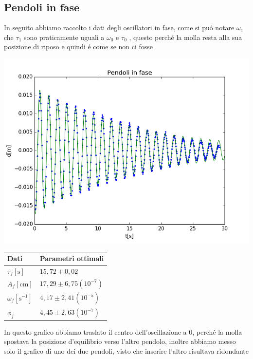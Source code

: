 \documentclass{exam}
\begin{document}
			\subsection{Pendoli in fase}
			In seguito abbiamo raccolto i dati degli oscillatori in fase, come si pu\'o notare $\omega_{1}$ che $\tau_{1}$ sono praticamente uguali a $\omega_{0}$ e $\tau_{0}$ , questo perch\'e la molla resta alla sua posizione di riposo e quindi \'e come se non ci fosse\\
			\begin{minipage}{0.5\textwidth}
				\includegraphics[width=\textwidth]{fase}
			\end{minipage}
			\begin{minipage}{0.5\textwidth}
				\begin{tabular}{ll}
					\toprule
					Dati & Parametri ottimali \\
					\midrule
					$\tau_{f}[\textrm{s}]$ & $15,72 \pm 0,02$ \\
					$A_{f}[\textrm{cm}]$ & $17,29 \pm 6,75(10^{-7})$\\
					$\omega_{f}[{\textrm{s}^{-1}}]$ & $4,17 \pm 2,41(10^{-5})$\\			
					$\phi_{f}$ & $4,45 \pm 2,63(10^{-7})$\\
					\bottomrule
				\end{tabular}
			\end{minipage}
			In questo grafico abbiamo traslato il centro dell'oscillazione a 0, perch\'e la molla spostava la posizione d'equilibrio verso l'altro pendolo, inoltre abbiamo messo solo il grafico di uno dei due pendoli, visto che inserire l'altro risultava ridondante
\end{document}
